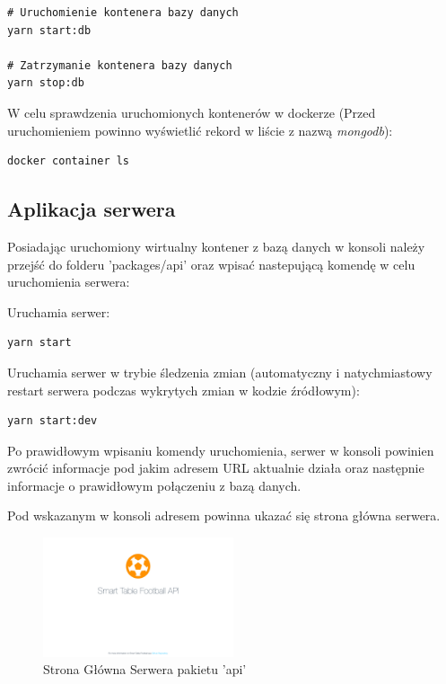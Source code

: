 \begin{lstlisting}
# Uruchomienie kontenera bazy danych
yarn start:db

# Zatrzymanie kontenera bazy danych
yarn stop:db
\end{lstlisting}

W celu sprawdzenia uruchomionych kontenerów w dockerze (Przed uruchomieniem powinno wyświetlić rekord w liście z nazwą \textit{mongodb}):

\begin{lstlisting}
docker container ls
\end{lstlisting}

\subsection{Aplikacja serwera}

Posiadając uruchomiony wirtualny kontener z bazą danych w konsoli należy przejść do folderu 'packages/api' oraz wpisać nastepującą komendę w celu uruchomienia serwera:

Uruchamia serwer:
\begin{lstlisting}
yarn start
\end{lstlisting}

Uruchamia serwer w trybie śledzenia zmian (automatyczny i natychmiastowy restart serwera podczas wykrytych zmian w kodzie źródłowym):
\begin{lstlisting}
yarn start:dev
\end{lstlisting}

Po prawidłowym wpisaniu komendy uruchomienia, serwer w konsoli powinien zwrócić informacje pod jakim adresem URL aktualnie działa oraz następnie informacje o prawidłowym połączeniu z bazą danych.


Pod wskazanym w konsoli adresem powinna ukazać się strona główna serwera.

\begin{figure}[h!]
  \centering
    \includegraphics[width=0.5\textwidth]{images/api/stf_api_home.png}
  \caption{Strona Główna Serwera pakietu 'api'}
  \label{fig:mobile}
\end{figure}


